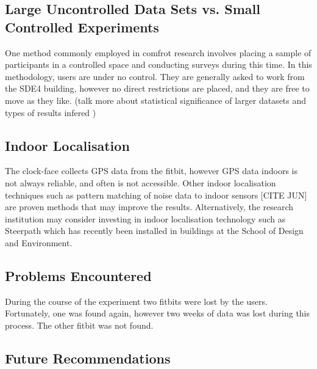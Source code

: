 
\subsection{Large Uncontrolled Data Sets vs. Small Controlled Experiments}

One method commonly employed in comfrot research involves placing a sample of participants in a controlled space and conducting surveys during this time. In this methodology, users are under no control. They are generally asked to work from the SDE4 building, however no direct restrictions are placed, and they are free to move as they like. (talk more about statistical significance of larger datasets and types of results infered )



\subsection{Indoor Localisation}

The clock-face collects GPS data from the fitbit, however GPS data indoors is not always reliable, and often is not accessible. Other indoor localisation techniques such as pattern matching of noise data to indoor sensors [CITE JUN] are proven methods that may improve the results. Alternatively, the research institution may consider investing in indoor localisation technology such as Steerpath which has recently been installed in buildings at the School of Design and Environment. 



\subsection{Problems Encountered}

During the course of the experiment two fitbits were lost by the users. Fortunately, one was found again, however two weeks of data was lost during this process. The other fitbit was not found. 

\subsection{Future Recommendations}



